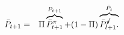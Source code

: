 \begin{eqnarray}
  \label{eq:mathbfPtp1}
  \bar{{P}}_{t+1} & = & \Pi \overbrace{\bar{{P}}_{t+1}^{{\pi}}}^{{P}_{t+1}} + (1-\Pi) \overbrace{\bar{{P}}_{t+1}^{\cancel{{\pi}}} .}^{\bar{{P}}_{t}}
\end{eqnarray}
